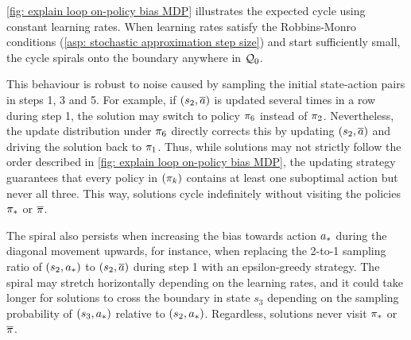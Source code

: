 


\autoref{fig: explain loop on-policy bias MDP} illustrates the expected cycle using constant learning rates. 
When learning rates satisfy the Robbins-Monro conditions (\autoref{asp: stochastic approximation step size}) and start sufficiently small, 
the cycle spirals onto the boundary anywhere in $\mathcal{Q}_0$.



This behaviour is robust to noise caused by sampling the initial state-action pairs in steps 1, 3 and 5.
For example, if $(s_2, \overline{a})$ is updated several times in a row during step 1, the solution may switch to policy $\pi_6$ instead of $\pi_2$.
Nevertheless, the update distribution under $\pi_6$ directly corrects this by updating $(s_2, \overline{a})$ and driving the solution back to $\pi_1$.
Thus, while solutions may not strictly follow the order described in \autoref{fig: explain loop on-policy bias MDP}, the updating strategy guarantees that every policy in $(\pi_k)$ contains at least one suboptimal action but never all three. 
This way, solutions cycle indefinitely without visiting the policies ${\pi}_*$ or $\overline{\pi}$.


The spiral also persists when increasing the bias towards action ${a}_*$ during the diagonal movement upwards,
for instance, when replacing the 2-to-1 sampling ratio of $(s_2, {a}_*)$ to $(s_2, \overline{a})$ during step 1 with an epsilon-greedy strategy.
The spiral may stretch horizontally depending on the learning rates,
and it could take longer for solutions to cross the boundary in state $s_3$ depending on the sampling probability of $(s_3, {a}_*)$ relative to $(s_2, {a}_*)$.
Regardless, solutions never visit ${\pi}_*$ or $\overline{\pi}$.


